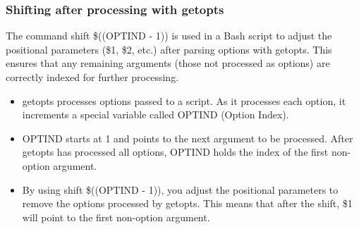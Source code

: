 \documentclass{report}
\begin{document}
    \subsubsection{Shifting after processing with getopts}
    \bigbreak \noindent 
    The command shift \$((OPTIND - 1)) is used in a Bash script to adjust the positional parameters (\$1, \$2, etc.) after parsing options with getopts. This ensures that any remaining arguments (those not processed as options) are correctly indexed for further processing.
    \begin{itemize}
        \item getopts processes options passed to a script. As it processes each option, it increments a special variable called OPTIND (Option Index).
        \item OPTIND starts at 1 and points to the next argument to be processed. After getopts has processed all options, OPTIND holds the index of the first non-option argument.
        \item By using shift \$((OPTIND - 1)), you adjust the positional parameters to remove the options processed by getopts. This means that after the shift, \$1 will point to the first non-option argument.
    \end{itemize}
\end{document}
